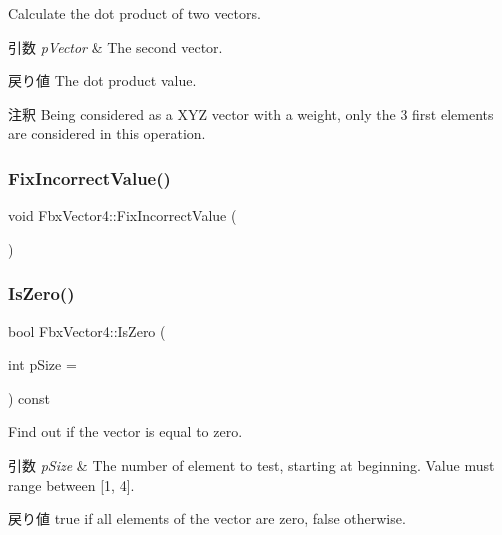 Calculate the dot product of two vectors. 
\begin{DoxyParams}{引数}
{\em p\+Vector} & The second vector. \\
\hline
\end{DoxyParams}
\begin{DoxyReturn}{戻り値}
The dot product value. 
\end{DoxyReturn}
\begin{DoxyRemark}{注釈}
Being considered as a X\+YZ vector with a weight, only the 3 first elements are considered in this operation. 
\end{DoxyRemark}
\mbox{\label{class_fbx_vector4_adb1810b99d85ab324cfe837fb286dcd2}} 
\subsubsection{\texorpdfstring{Fix\+Incorrect\+Value()}{FixIncorrectValue()}}
{\footnotesize\ttfamily void Fbx\+Vector4\+::\+Fix\+Incorrect\+Value (\begin{DoxyParamCaption}{ }\end{DoxyParamCaption})}

\mbox{\label{class_fbx_vector4_ad64896518153da4f6c72b8d75082c8f3}} 
\subsubsection{\texorpdfstring{Is\+Zero()}{IsZero()}}
{\footnotesize\ttfamily bool Fbx\+Vector4\+::\+Is\+Zero (\begin{DoxyParamCaption}\item[{int}]{p\+Size = {} }\end{DoxyParamCaption}) const}

Find out if the vector is equal to zero. 
\begin{DoxyParams}{引数}
{\em p\+Size} & The number of element to test, starting at beginning. Value must range between \mbox{[}1, 4\mbox{]}. \\
\hline
\end{DoxyParams}
\begin{DoxyReturn}{戻り値}
{\ttfamily true} if all elements of the vector are zero, {\ttfamily false} otherwise. 
\end{DoxyReturn}
\mbox{\label{class_fbx_vector4_acf75b4a04b333460947133c59c57fd6b}} 
